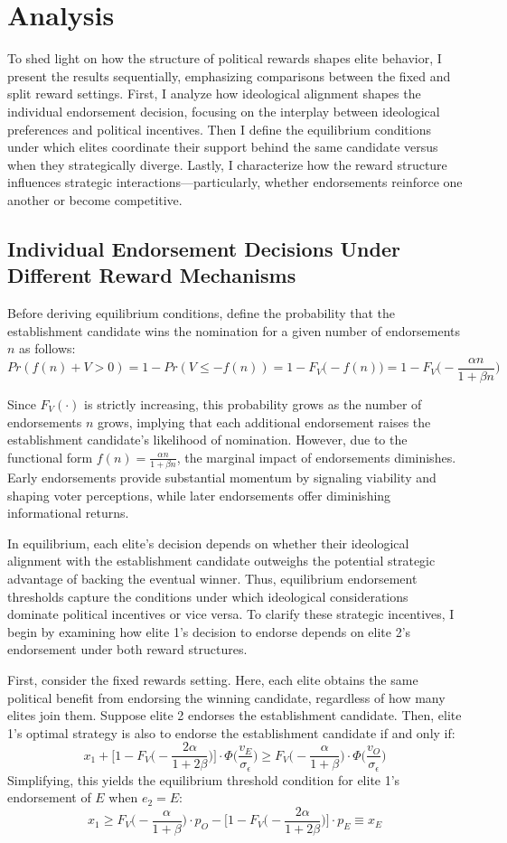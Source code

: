 \section{Analysis}
To shed light on how the structure of political rewards shapes elite behavior, I present the results sequentially, emphasizing comparisons between the fixed and split reward settings. First, I analyze how ideological alignment shapes the individual endorsement decision, focusing on the interplay between ideological preferences and political incentives. Then I define the equilibrium conditions under which elites coordinate their support behind the same candidate versus when they strategically diverge. Lastly, I characterize how the reward structure influences strategic interactions—particularly, whether endorsements reinforce one another or become competitive.

\subsection*{Individual Endorsement Decisions Under Different Reward Mechanisms}
Before deriving equilibrium conditions, define the probability that the establishment candidate wins the nomination for a given number of endorsements $n$ as follows: 
\[Pr(f(n) + V > 0) = 1 - Pr(V \leq -f(n))= 1- F_V\bigg(-f(n)\bigg) = 1- F_V\bigg(-\frac{\alpha n}{1+\beta n}\bigg)\]

Since $F_V(\cdot)$ is strictly increasing, this probability grows as the number of endorsements $n$ grows, implying that each additional endorsement raises the establishment candidate’s likelihood of nomination. However, due to the functional form $f(n) = \frac{\alpha n}{1+ \beta n}$, the marginal impact of endorsements diminishes. Early endorsements provide substantial momentum by signaling viability and shaping voter perceptions, while later endorsements offer diminishing informational returns.

In equilibrium, each elite’s decision depends on whether their ideological alignment with the establishment candidate outweighs the potential strategic advantage of backing the eventual winner. Thus, equilibrium endorsement thresholds capture the conditions under which ideological considerations dominate political incentives or vice versa. To clarify these strategic incentives, I begin by examining how elite 1’s decision to endorse depends on elite 2’s endorsement under both reward structures.

First, consider the fixed rewards setting. Here, each elite obtains the same political benefit from endorsing the winning candidate, regardless of how many elites join them. Suppose elite 2 endorses the establishment candidate. Then, elite 1's optimal strategy is also to endorse the establishment candidate if and only if:
\[
    x_1 + \bigg[1- F_V\bigg(-\frac{2\alpha}{1+2\beta}\bigg)\bigg]\cdot \Phi\bigg(\frac{v_E}{\sigma_{\epsilon}}\bigg) \geq F_V\bigg(-\frac{\alpha}{1+\beta}\bigg)\cdot \Phi\bigg(\frac{v_O}{\sigma_{\epsilon}}\bigg)
\]
Simplifying, this yields the equilibrium threshold condition for elite 1’s endorsement of $E$ when $e_2 = E$:
\[
    x_1 \geq F_V\bigg(-\frac{\alpha}{1+\beta}\bigg)\cdot p_O - \bigg[1- F_V\bigg(-\frac{2\alpha}{1+2\beta}\bigg)\bigg]\cdot p_E \equiv x_E
\]

